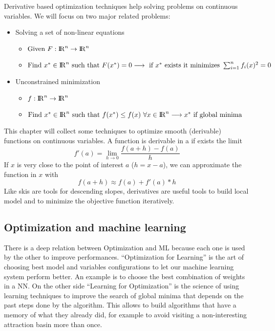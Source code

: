 \documentclass[10pt]{article}
\begin{document}
Derivative based optimization techniques help solving problems on continuous variables. We will focus on two major related problems:
\begin{itemize}
\item{Solving a set of non-linear equations \\
	\begin{itemize}
	\item{ $ \text{Given } F : {\rm I\!R}^n \rightarrow {\rm I\!R}^n $ }
	\item{ $ \text{Find } x^\ast \in {\rm I\!R}^n \text{ such that } F(x^\ast) = 0 \longrightarrow \text{ if } x^\ast \text{ exists it minimizes } \sum_{i=1}^{n} f_i(x)^2 = 0 $ }
	\end{itemize}
}\bigskip
\item{
	Unconstrained minimization \\
	\begin{itemize}
	\item{ $ f : {\rm I\!R}^n \rightarrow {\rm I\!R}^n $ }
	\item{ $ \text{Find } x^\ast \in {\rm I\!R}^n \text{ such that } f(x^\ast) \leq f(x) \ \forall x \in {\rm I\!R}^n \longrightarrow x^\ast \text{ if global minima } $ }
	\end{itemize}
}
\end{itemize}
This chapter will collect some techniques to optimize smooth (derivable) functions on continuous variables. A function is derivable in a if exists the limit $$
f'(a) = \lim_{h\to0} \frac{f(a+h) - f(a)}{h} $$ If $x$ is very close to the point of interest $a$ ($h = x-a$), we can approximate the function in $x$ with $$ f(a+h) \approx f(a) + f'(a)*h $$ Like skis are tools for descending slopes, derivatives are useful tools to build local model and to minimize the objective function iteratively.

\subsection{Optimization and machine learning}

There is a deep relation between Optimization and ML because each one is used by the other to improve performances. ``Optimization for Learning'' is the art of choosing best model and variables configurations to let our machine learning system perform better. An example is to choose the best combination of weights in a NN. On the other side ``Learning for Optimization'' is the science of using learning techniques to improve the search of global minima that depends on the past steps done by the algorithm. This allows to build algorithms that have a memory of what they already did, for example to avoid visiting a non-interesting attraction basin more than once.
\end{document}
